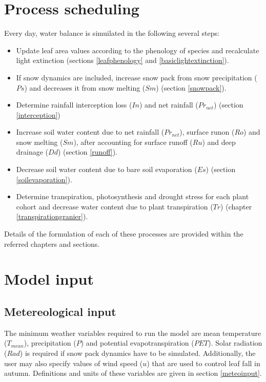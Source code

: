 \documentclass[]{book}
\providecommand{\tightlist}{%
  \setlength{\itemsep}{0pt}\setlength{\parskip}{0pt}}
\begin{document}
\section{Process scheduling}\label{process-scheduling}

Every day, water balance is simuilated in the following several steps:

\begin{itemize}
\tightlist
\item
  Update leaf area values according to the phenology of species and
  recalculate light extinction (sections \ref{leafphenology} and
  \ref{basiclightextinction}).
\item
  If snow dynamics are included, increase snow pack from snow
  precipitation (\(Ps\)) and decreases it from snow melting (\(Sm\))
  (section \ref{snowpack}).
\item
  Determine rainfall interception loss (\(In\)) and net rainfall
  (\(Pr_{net}\)) (section \ref{interception})
\item
  Increase soil water content due to net rainfall (\(Pr_{net}\)),
  surface runon (\(Ro\)) and snow melting (\(Sm\)), after accounting for
  surface runoff (\(Ru\)) and deep drainage (\(Dd\)) (section
  \ref{runoff}).
\item
  Decrease soil water content due to bare soil evaporation (\(Es\))
  (section \ref{soilevaporation}).
\item
  Determine transpiration, photosynthesis and drought stress for each
  plant cohort and decrease water content due to plant transpiration
  (\(Tr\)) (chapter \ref{transpirationgranier}).
\end{itemize}

Details of the formulation of each of these processes are provided
within the referred chapters and sections.

\section{Model input}\label{model-input}

\subsection{Metereological input}\label{metereological-input}

The minimum weather variables required to run the model are mean
temperature (\(T_{mean}\)), precipitation (\(P\)) and potential
evapotranspiration (\(PET\)). Solar radiation (\(Rad\)) is required if
snow pack dynamics have to be simulated. Additionally, the user may also
specify values of wind speed (\(u\)) that are used to control leaf fall
in autumn. Definitions and units of these variables are given in section
\ref{meteoinput}.
\end{document}
